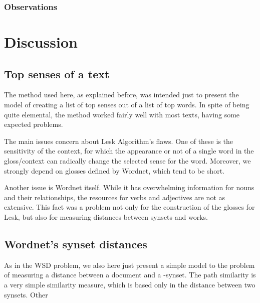 \documentclass{pnastwo}
\begin{document}
\begin{article}




\newpage

\subsubsection{Observations}

\section{Discussion}


\subsection{Top senses of a text}
The method used here, as explained before, was intended just to present the model of creating a list of top senses out of a list of top words. In spite of being quite elemental, the method worked fairly well with most texts, having some expected problems.

The main issues concern about Lesk Algorithm's flaws. One of these is the sensitivity of the context, for which the appearance or not of a single word in the gloss/context can radically change the selected sense for the word. Moreover, we strongly depend on glosses defined by Wordnet, which tend to be short.

Another issue is Wordnet itself. While it has overwhelming information for nouns and their relationships, the resources for verbs and adjectives are not as extensive. This fact was a problem not only for the construction of the glosses for Lesk, but also for measuring distances between synsets and works.

\subsection{Wordnet's synset distances}

As in the WSD problem, we also here just present a simple model to the problem of measuring a distance between a document and a -synset. The path similarity is a very simple similarity measure, which is based only in the distance between two synsets. Other 


\end{article}
\end{document}
